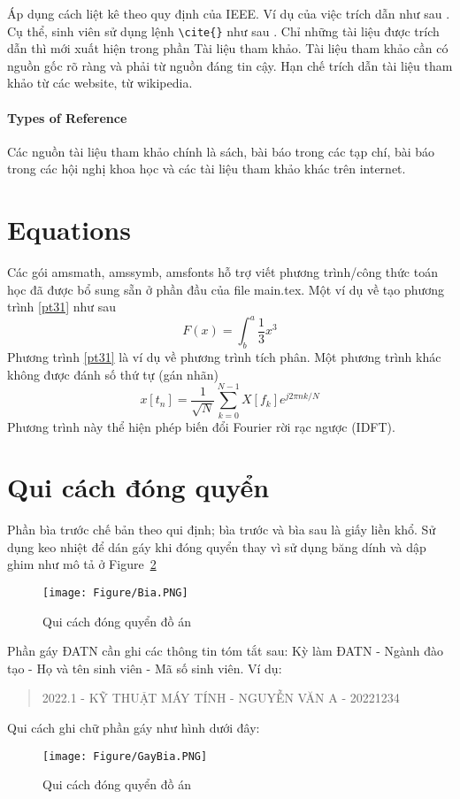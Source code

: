 \documentclass[../Main.tex]{subfiles}
\begin{document}
Áp dụng cách liệt kê theo quy định của IEEE. Ví dụ của việc trích dẫn như sau \cite{scott2013sdn}. Cụ thể, sinh viên sử dụng lệnh \verb!\cite{}! như sau \cite{ashton2009internet}. Chỉ những tài liệu được trích dẫn thì mới xuất hiện trong phần Tài liệu tham khảo. Tài liệu tham khảo cần có nguồn gốc rõ ràng và phải từ nguồn đáng tin cậy. Hạn chế trích dẫn tài liệu tham khảo từ các website, từ wikipedia.
\paragraph{Types of Reference}\mbox{}

Các nguồn tài liệu tham khảo chính là sách, bài báo trong các tạp chí, bài báo trong các hội nghị khoa học và các tài liệu tham khảo khác trên internet.

\section{Equations}
Các gói amsmath, amssymb, amsfonts hỗ trợ viết phương trình/công thức toán học đã được bổ sung sẵn ở phần đầu của file main.tex. Một ví dụ về tạo phương trình \eqref{pt31} như sau 
\begin{equation}\label{pt31}
    F(x) = \int^a_b \frac{1}{3}x^3
\end{equation}
Phương trình \ref{pt31} là ví dụ về phương trình tích phân. Một phương trình khác không được đánh số thứ tự (gán nhãn)
\begin{equation*}\label{pt32}
    x[t_n] = \frac{1}{\sqrt{N}} \sum_{k=0}^{N-1}X[f_k]e^{j 2\pi n k/N}
\end{equation*}
Phương trình này thể hiện phép biến đổi Fourier rời rạc ngược (IDFT).

\section{Qui cách đóng quyển}
Phần bìa trước chế bản theo qui định; bìa trước và bìa sau là giấy liền khổ. Sử dụng keo nhiệt để dán gáy khi đóng quyển thay vì sử dụng băng dính và dập ghim như mô tả ở Figure~\ref{fig:Bia}
\begin{figure}
\centering
\texttt{[image: Figure/Bia.PNG]}
\caption{Qui cách đóng quyển đồ án}
\label{fig:Bia}
\end{figure} 
Phần gáy ĐATN cần ghi các thông tin tóm tắt sau:
Kỳ làm ĐATN - Ngành đào tạo - Họ và tên sinh viên - Mã số sinh viên. Ví dụ:
\begin{quote}
2022.1 - KỸ THUẬT MÁY TÍNH - NGUYỄN VĂN A - 20221234
\end{quote}
Qui cách ghi chữ phần gáy như hình dưới đây:
\begin{figure}
\centering
\texttt{[image: Figure/GayBia.PNG]}
\caption{Qui cách đóng quyển đồ án}
\label{fig:Bia}
\end{figure} 
\end{document}
